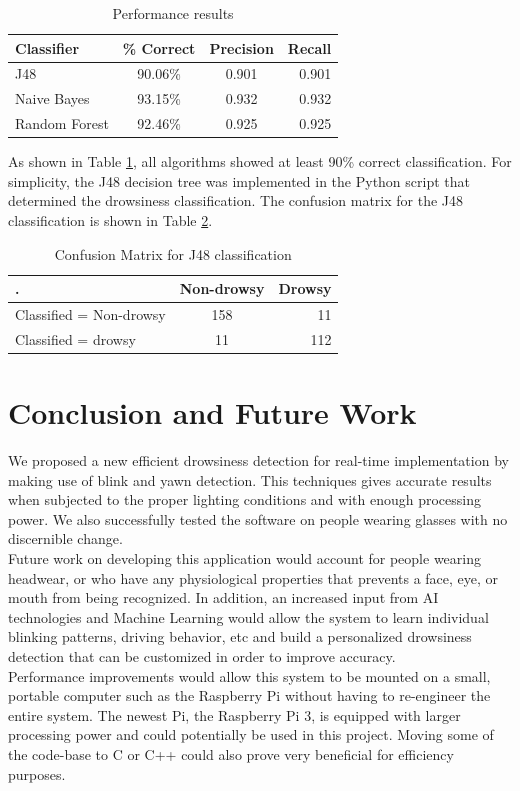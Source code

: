 \documentclass[twocolumn]{article}
\begin{document}
\begin{table}[H]
\centering
\begin{tabular}{l|c|c|r}
Classifier & \% Correct & Precision & Recall \\\hline
J48 & 90.06\% & 0.901 & 0.901 \\
Naive Bayes & 93.15\% & 0.932 & 0.932 \\
Random Forest & 92.46\% & 0.925 & 0.925
\end{tabular}
\caption{\label{tab:algo_compare}Performance results}
\end{table}

As shown in Table \ref{tab:algo_compare}, all algorithms showed at least 90\% correct classification. For simplicity, the J48 decision tree was implemented in the Python script that determined the drowsiness classification. The confusion matrix for the J48 classification is shown in Table \ref{tab:confusion}. 
\begin{table}[H]
\centering
\begin{tabular}{l|c|r}
.& Non-drowsy & Drowsy  \\\hline
Classified = Non-drowsy & 158 & 11 \\
Classified = drowsy & 11 & 112 
\end{tabular}
\caption{\label{tab:confusion}Confusion Matrix for J48 classification}
\end{table}


\section{Conclusion and Future Work}
We proposed a new efficient drowsiness detection for real-time implementation by making use of blink and yawn detection. This techniques gives accurate results when subjected to the proper lighting conditions and with enough processing power. We also successfully tested the software on people wearing glasses with no discernible change.\\
Future work on developing this application would account for people wearing headwear, or who have any physiological properties that prevents a face, eye, or mouth from being recognized. In addition, an increased input from AI technologies and Machine Learning would allow the system to learn individual blinking patterns, driving behavior, etc and build a personalized drowsiness detection that can be customized in order to improve accuracy. \\
Performance improvements would allow this system to be mounted on a small, portable computer such as the Raspberry Pi without having to re-engineer the entire system. The newest Pi, the Raspberry Pi 3, is equipped with larger processing power and could potentially be used in this project. Moving some of the code-base to C or C++ could also prove very beneficial for efficiency purposes. 
\end{document}
